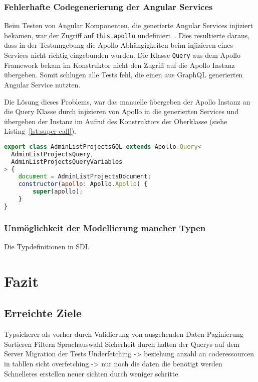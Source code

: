\subsection{Fehlerhafte Codegenerierung der Angular Services}
Beim Testen von Angular Komponenten, die generierte Angular Services injiziert bekamen, war der Zugriff auf \lstinline|this.apollo| undefiniert~\cite{github-apollo-undefined}. Dies resultierte daraus, dass in der Testumgebung die Apollo Abhängigkeiten beim injizieren eines Services nicht richtig eingebunden wurden. Die Klasse \lstinline|Query| aus dem Apollo Framework bekam im Konstruktor nicht den Zugriff auf die Apollo Instanz übergeben. Somit schlugen alle Tests fehl, die einen aus GraphQL generierten Angular Service nutzten.

Die Lösung dieses Problems, war das manuelle übergeben der Apollo Instanz an die Query Klasse durch injizieren von Apollo in die generierten Services und übergeben der Instanz im Aufruf des Konstruktors der Oberklasse (siehe Listing~\ref{lst:super-call}).

\begin{lstlisting}[language=JavaScript,float=h!,caption={Injizieren von Apollo in generierten Angular Service und übdergeben der Apollo Instanz an den Konstruktors der Oberklasse}, label={lst:super-call}]
export class AdminListProjectsGQL extends Apollo.Query<
  AdminListProjectsQuery,
  AdminListProjectsQueryVariables
> {
	document = AdminListProjectsDocument;
	constructor(apollo: Apollo.Apollo) {
		super(apollo);
	}
}
\end{lstlisting}

\subsection{Unmöglichkeit der Modellierung mancher Typen}
Die Typdefinitionen in SDL

\chapter{Fazit}
\section{Erreichte Ziele}
Typsicherer als vorher durch Validierung von ausgehenden Daten
Paginierung
Sortieren Filtern Sprachauswahl
Sicherheit durch halten der Querys auf dem Server
Migration der Tests
Underfetching -> beziehung anzahl an coderessourcen in tabllen sicht
overfetching -> nur noch die daten die benötigt werden
Schnelleres erstellen neuer sichten durch weniger schritte

